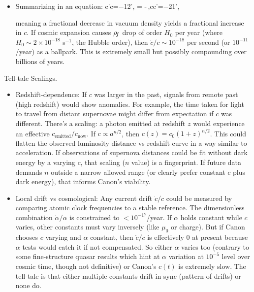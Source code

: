 \documentclass[11pt]{article}
\begin{document}
\begin{itemize}
\item 
Summarizing in an equation: c˙c=−12\rhoF˙\rhoF, = -\frac{\dot{\rhoF}}{\rhoF}\,,cc˙=−21\rhoF\rhoF˙,

meaning a fractional decrease in vacuum density yields a fractional increase in $c$. If cosmic expansion causes $\rho_{\!f}$ drop of order $H_0$ per year (where $H_0 \sim 2\times10^{-18}$ s$^{-1}$, the Hubble order), then $\dot{c}/c \sim 10^{-18}$ per second (or $10^{-11}$/year) as a ballpark. This is extremely small but possibly compounding over billions of years.




\end{itemize}

Tell-tale Scalings.


\begin{itemize}

\item 
Redshift-dependence: If $c$ was larger in the past, signals from remote past (high redshift) would show anomalies. For example, the time taken for light to travel from distant supernovae might differ from expectation if $c$ was different. There’s a scaling: a photon emitted at redshift $z$ would experience an effective $c_{\text{emitted}}/c_{\text{now}}$. If $c \propto a^{n/2}$, then $c(z) = c_0 (1+z)^{n/2}$. This could flatten the observed luminosity distance vs redshift curve in a way similar to acceleration. If observations of supernova distances could be fit without dark energy by a varying $c$, that scaling ($n$ value) is a fingerprint. If future data demands $n$ outside a narrow allowed range (or clearly prefer constant $c$ plus dark energy), that informs Canon’s viability.




\item 
Local drift vs cosmological: Any current drift $\dot{c}/c$ could be measured by comparing atomic clock frequencies to a stable reference. The dimensionless combination $\dot{\alpha}/\alpha$ is constrained to $<10^{-17}$/year. If $\alpha$ holds constant while $c$ varies, other constants must vary inversely (like $\mu_0$ or charge). But if Canon chooses $c$ varying and $\alpha$ constant, then $\dot{c}/c$ is effectively 0 at present because $\alpha$ tests would catch it if not compensated. So either $\alpha$ varies too (contrary to some fine-structure quasar results which hint at $\alpha$ variation at $10^{-5}$ level over cosmic time, though not definitive) or Canon’s $c(t)$ is extremely slow. The tell-tale is that either multiple constants drift in sync (pattern of drifts) or none do.





\end{itemize}
\end{document}
